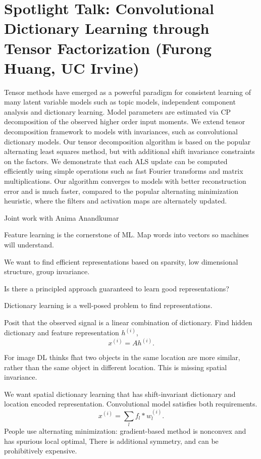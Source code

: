 \section{Spotlight Talk: Convolutional Dictionary Learning through Tensor Factorization (Furong Huang, UC Irvine)}

Tensor methods have emerged as a powerful paradigm for consistent learning of many latent variable models such as topic models, independent component analysis and dictionary learning. Model parameters are estimated via CP decomposition of the observed higher order input moments. We extend tensor decomposition framework to models with invariances, such as convolutional dictionary models. Our tensor decomposition algorithm is based on the popular alternating least squares method, but with additional shift invariance constraints on the factors. We demonstrate that each ALS update can be computed efficiently using simple operations such as fast Fourier transforms and matrix multiplications. Our algorithm converges to models with better reconstruction error and is much faster, compared to the popular alternating minimization heuristic, where the filters and activation maps are alternately updated. 

Joint work with Anima Anandkumar


Feature learning is the cornerstone of ML. Map words into vectors so machines will understand. 

We want to find efficient representations based on sparsity, low dimensional structure, group invariance.

Is there a principled approach guaranteed to learn good representations?

Dictionary learning is  a well-posed problem to find representations.

Posit that the observed signal is a linear combination of dictionary. Find hidden dictionary and feature representation $h^{(i)}$,
$$
x^{(i)} = Ah^{(i)}. 
$$

For image DL thinks fhat two objects in the same location are more similar, rather than the same object in different location. This is missing spatial invariance. %

We want spatial dictionary learning that has shift-invariant dictionary and location encoded representation. Convolutional model satisfies both requirements.
$$
x^{(i)} = \sum_l f_l * w_l^{(i)}.
$$
People use alternating minimization: gradient-based method is nonconvex and has spurious local optimal, There is additional symmetry, and can be prohibitively expensive.

